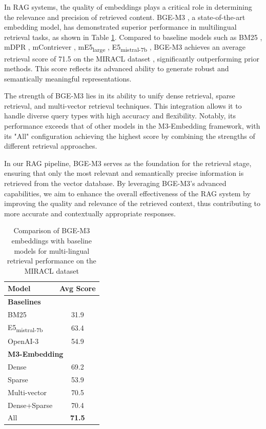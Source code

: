 In RAG systems, the quality of embeddings plays a critical role in determining the relevance and precision of retrieved content. BGE-M3 \cite{chen2024bge}, a state-of-the-art embedding model, has demonstrated superior performance in multilingual retrieval tasks, as shown in Table \ref{tab:bge_m3_comparison}. Compared to baseline models such as BM25 \cite{bm25}, mDPR \cite{mdpr}, mContriever \cite{mcontriever}, mE5\textsubscript{large} \cite{wang2024e5}, E5\textsubscript{mistral-7b} \cite{wang2024e5_improve}, BGE-M3 achieves an average retrieval score of 71.5 on the MIRACL dataset \cite{miracl}, significantly outperforming prior methods. This score reflects its advanced ability to generate robust and semantically meaningful representations.

The strength of BGE-M3 lies in its ability to unify dense retrieval, sparse retrieval, and multi-vector retrieval techniques. This integration allows it to handle diverse query types with high accuracy and flexibility. Notably, its performance exceeds that of other models in the M3-Embedding framework, with its "All" configuration achieving the highest score by combining the strengths of different retrieval approaches.

In our RAG pipeline, BGE-M3 serves as the foundation for the retrieval stage, ensuring that only the most relevant and semantically precise information is retrieved from the vector database. By leveraging BGE-M3’s advanced capabilities, we aim to enhance the overall effectiveness of the RAG system by improving the quality and relevance of the retrieved context, thus contributing to more accurate and contextually appropriate responses.

\begin{table}[h!]
	\centering
	\begin{tabular}{l c}
		\hline
		\textbf{Model}               & \textbf{Avg Score} \\ \hline
		\multicolumn{2}{l}{\textbf{Baselines}} \\ \hline
		BM25 \cite{bm25}                         & 31.9               \\
		E5\textsubscript{mistral-7b} \cite{wang2024e5_improve} & 63.4               \\
		OpenAI-3                     & 54.9               \\ \hline
		\multicolumn{2}{l}{\textbf{M3-Embedding \cite{chen2024bge}}}  \\ \hline
		Dense                        & 69.2               \\
		Sparse                       & 53.9               \\
		Multi-vector                 & 70.5               \\
		Dense+Sparse                 & 70.4               \\
		All                          & \textbf{71.5}      \\ \hline
	\end{tabular}
	\caption{Comparison of BGE-M3 embeddings with baseline models for multi-lingual retrieval performance on the MIRACL dataset \cite{chen2024bge}}
	\label{tab:bge_m3_comparison}
\end{table}

